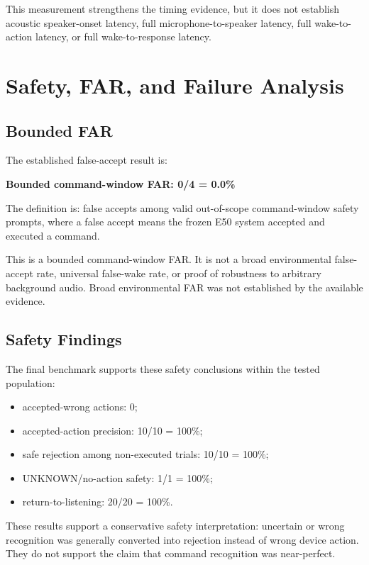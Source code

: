 \documentclass[11pt]{article}
\begin{document}
This measurement strengthens the timing evidence, but it does not establish acoustic speaker-onset latency, full microphone-to-speaker latency, full wake-to-action latency, or full wake-to-response latency.

\section{Safety, FAR, and Failure Analysis}

\subsection{Bounded FAR}

The established false-accept result is:

\begin{center}
\textbf{Bounded command-window FAR: 0/4 = 0.0\%}
\end{center}

The definition is: false accepts among valid out-of-scope command-window safety prompts, where a false accept means the frozen E50 system accepted and executed a command.

This is a bounded command-window FAR. It is not a broad environmental false-accept rate, universal false-wake rate, or proof of robustness to arbitrary background audio. Broad environmental FAR was not established by the available evidence.

\subsection{Safety Findings}

The final benchmark supports these safety conclusions within the tested population:

\begin{itemize}
\item accepted-wrong actions: 0;
\item accepted-action precision: 10/10 = 100\%;
\item safe rejection among non-executed trials: 10/10 = 100\%;
\item UNKNOWN/no-action safety: 1/1 = 100\%;
\item return-to-listening: 20/20 = 100\%.
\end{itemize}

These results support a conservative safety interpretation: uncertain or wrong recognition was generally converted into rejection instead of wrong device action. They do not support the claim that command recognition was near-perfect.
\end{document}
